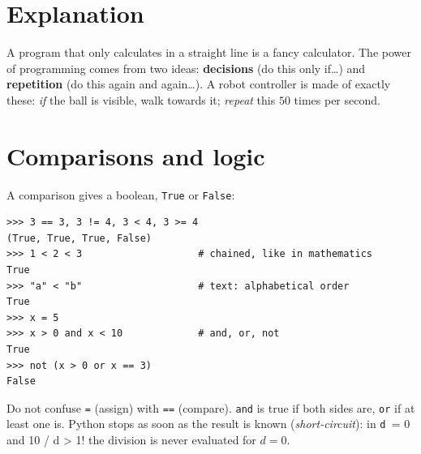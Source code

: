 \label{ch:py2}

\section*{Explanation}
A program that only calculates in a straight line is a fancy calculator. The power of programming comes from two ideas: \textbf{decisions} (do this only if\dots) and \textbf{repetition} (do this again and again\dots). A robot controller is made of exactly these: \emph{if} the ball is visible, walk towards it; \emph{repeat} this $50$ times per second.

\section*{Comparisons and logic}
A comparison gives a boolean, \texttt{True} or \texttt{False}:
\begin{verbatim}
>>> 3 == 3, 3 != 4, 3 < 4, 3 >= 4
(True, True, True, False)
>>> 1 < 2 < 3                    # chained, like in mathematics
True
>>> "a" < "b"                    # text: alphabetical order
True
>>> x = 5
>>> x > 0 and x < 10             # and, or, not
True
>>> not (x > 0 or x == 3)
False
\end{verbatim}
Do not confuse \texttt{=} (assign) with \texttt{==} (compare). \texttt{and} is true if both sides are, \texttt{or} if at least one is. Python stops as soon as the result is known (\emph{short-circuit}): in \verb!d != 0 and 10 / d > 1! the division is never evaluated for $d=0$.

